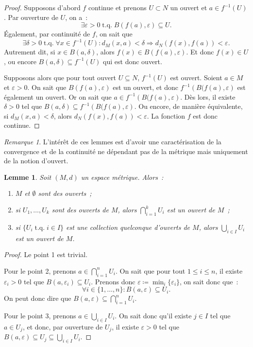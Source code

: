 \documentclass{report}
\newtheorem{lem}[thm]{Lemme}
\theoremstyle{definition}
\theoremstyle{remark}
\newtheorem*{rmq}{Remarque}
\DeclareMathOperator{\tq}{\text{ t.q. }}
\begin{document}
		\begin{proof} Supposons d'abord $f$ continue et prenons $U \subset N$ un ouvert et $a \in f^{-1}(U)$. Par ouverture de $U$, on a~:
		\[\exists \varepsilon > 0 \tq B(f(a), \varepsilon) \subseteq U.\]
		Également, par continuité de $f$, on sait que~
		\[\exists \delta > 0 \tq \forall x \in f^{-1}(U) : d_M(x, a) < \delta \Rightarrow d_N(f(x), f(a)) < \varepsilon.\]
		Autrement dit, si $x \in B(a, \delta)$, alors $f(x) \in B(f(a), \varepsilon)$. Et donc $f(x) \in U$, ou encore $B(a, \delta) \subseteq f^{-1}(U)$ qui est
		donc ouvert.

		Supposons alors que pour tout ouvert $U \subseteq N$, $f^{-1}(U)$ est ouvert. Soient $a \in M$ et $\varepsilon > 0$.
		On sait que $B(f(a), \varepsilon)$ est un ouvert, et donc $f^{-1}\left(B(f(a), \varepsilon\right)$ est également un ouvert. Or on sait que
		$a \in f^{-1}\left(B(f(a), \varepsilon\right)$. Dès lors, il existe $\delta > 0$ tel que $B(a, \delta) \subseteq f^{-1}\left(B(f(a), \varepsilon\right)$.
		Ou encore, de manière équivalente, si $d_M(x, a) < \delta$, alors $d_N(f(x), f(a)) < \varepsilon$. La fonction $f$ est donc continue.
		\end{proof}

		\begin{rmq} L'intérêt de ces lemmes est d'avoir une caractérisation de la convergence et de la continuité ne dépendant pas de la métrique mais uniquement
		de la notion d'ouvert.
		\end{rmq}

		\begin{lem}\label{lem:espmetraxiomestop} Soit $(M, d)$ un espace métrique. Alors~:
		\begin{enumerate}
			\item $M$ et $\emptyset$ sont des ouverts~;
			\item si $U_1, \ldots, U_k$ sont des ouverts de $M$, alors $\bigcap_{i=1}^kU_i$ est un ouvert de $M$~;
			\item si $\{U_i \tq i \in I\}$ est une collection quelconque d'ouverts de $M$, alors $\bigcup_{i\in I}U_i$ est un ouvert de $M$.
		\end{enumerate}
		\end{lem}

		\begin{proof} Le point 1 est trivial.

		Pour le point 2, prenons $a \in \bigcap_{i=1}^nU_i$. On sait que pour tout $1 \leq i \leq n$, il existe $\varepsilon_i > 0$ tel que
		$B(a, \varepsilon_i) \subseteq U_i$. Prenons donc $\varepsilon \coloneqq \min_i\{\varepsilon_i\}$, on sait donc que~:
		\[\forall i \in \{1, \ldots, n\} : B(a, \varepsilon) \subseteq U_i.\]
		On peut donc dire que $B(a, \varepsilon) \subseteq \bigcap_{i=1}^nU_i$.

		Pour le point 3, prenons $a \in \bigcup_{i\in I}U_i$. On sait donc qu'il existe $j \in I$ tel que $a \in U_j$, et donc, par ouverture de $U_j$, il existe
		$\varepsilon > 0$ tel que $B(a, \varepsilon) \subseteq U_j \subseteq \bigcup_{i\in I}U_i$.
		\end{proof}
\end{document}
